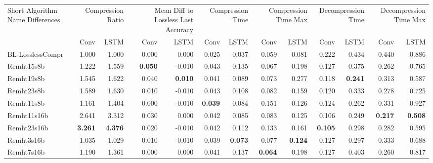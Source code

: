 \begin{tabular}{lrrrrrrrrrrrr}
\toprule
\multicolumn{1}{p{2.5cm}}{Short Algorithm Name Differences} & \multicolumn{2}{p{1.8cm}}{Compression Ratio} & \multicolumn{2}{p{1.8cm}}{Mean Diff to Lossless Last Accuracy} & \multicolumn{2}{p{1.8cm}}{Compression Time} & \multicolumn{2}{p{1.8cm}}{Compression Time Max} & \multicolumn{2}{p{1.8cm}}{Decompression Time} & \multicolumn{2}{p{1.8cm}}{Decompression Time Max} \\
 & Conv & LSTM & Conv & LSTM & Conv & LSTM & Conv & LSTM & Conv & LSTM & Conv & LSTM \\
\midrule
BL-LosslessCompr & 1.000 & 1.000 & 0.000 & 0.000 & 0.025 & 0.037 & 0.059 & 0.081 & 0.222 & 0.434 & 0.440 & 0.886 \\
Remht15s8b & 1.222 & 1.559 & \bfseries 0.050 & -0.010 & 0.043 & 0.135 & 0.067 & 0.198 & 0.127 & 0.375 & 0.262 & 0.765 \\
Remht19s8b & 1.545 & 1.622 & 0.040 & \bfseries 0.010 & 0.041 & 0.089 & 0.073 & 0.277 & 0.118 & \bfseries 0.241 & 0.313 & 0.587 \\
Remht23s8b & 1.589 & 1.630 & 0.010 & -0.010 & 0.043 & 0.108 & 0.082 & 0.159 & 0.120 & 0.333 & 0.278 & 0.725 \\
Remht11s8b & 1.161 & 1.404 & 0.000 & -0.010 & \bfseries 0.039 & 0.084 & 0.151 & 0.126 & 0.124 & 0.262 & 0.331 & 0.927 \\
Remht11s16b & 2.641 & 3.312 & 0.030 & 0.000 & 0.042 & 0.085 & 0.083 & 0.125 & 0.106 & 0.249 & \bfseries 0.217 & \bfseries 0.508 \\
Remht23s16b & \bfseries 3.261 & \bfseries 4.376 & 0.020 & -0.010 & 0.042 & 0.112 & 0.133 & 0.161 & \bfseries 0.105 & 0.298 & 0.282 & 0.595 \\
Remht3s16b & 1.035 & 1.029 & 0.010 & -0.010 & 0.039 & \bfseries 0.073 & 0.077 & \bfseries 0.124 & 0.127 & 0.297 & 0.333 & 0.688 \\
Remht7s16b & 1.190 & 1.361 & 0.000 & 0.000 & 0.041 & 0.137 & \bfseries 0.064 & 0.198 & 0.127 & 0.403 & 0.260 & 0.817 \\
\bottomrule
\end{tabular}
